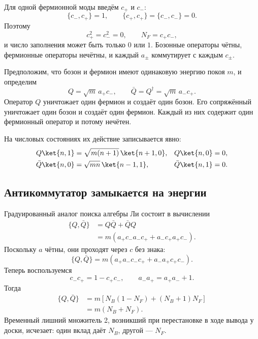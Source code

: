 Для одной фермионной моды введём \(c_+\) и \(c_-\):
\begin{equation}
\{c_-,c_+\}=1,
\qquad
\{c_+,c_+\}=\{c_-,c_-\}=0.
\end{equation}
Поэтому
\begin{equation}
c_+^2=c_-^2=0,
\qquad
N_F=c_+c_-,
\end{equation}
и число заполнения может быть только \(0\) или \(1\). Бозонные операторы чётны, фермионные операторы нечётны, и каждый \(a_\pm\) коммутирует с каждым \(c_\pm\).


Предположим, что бозон и фермион имеют одинаковую энергию покоя \(m\), и определим
\begin{equation}
Q=\sqrt m\,a_+c_-,
\qquad
\bar Q=Q^\dagger=\sqrt m\,a_-c_+.
\end{equation}
Оператор \(Q\) уничтожает один фермион и создаёт один бозон. Его сопряжённый уничтожает один бозон и создаёт один фермион. Каждый из них содержит один фермионный оператор и потому нечётен.

На числовых состояниях их действие записывается явно:
\begin{align}
Q\ket{n,1}
&=\sqrt{m(n+1)}\,\ket{n+1,0},
&
Q\ket{n,0}&=0,\\
\bar Q\ket{n,0}
&=\sqrt{mn}\,\ket{n-1,1},
&
\bar Q\ket{n,1}&=0.
\end{align}

\subsection{Антикоммутатор замыкается на энергии}

Градуированный аналог поиска алгебры Ли состоит в вычислении
\begin{align}
\{Q,\bar Q\}
&=Q\bar Q+\bar Q Q\\
&=m\left(a_+c_-a_-c_+
        +a_-c_+a_+c_-\right).
\end{align}
Поскольку \(a\) чётны, они проходят через \(c\) без знака:
\begin{equation}
\{Q,\bar Q\}
=m\left(a_+a_-c_-c_+
        +a_-a_+c_+c_-\right).
\end{equation}
Теперь воспользуемся
\begin{equation}
c_-c_+=1-c_+c_-,
\qquad
a_-a_+=a_+a_-+1.
\end{equation}
Тогда
\begin{align}
\{Q,\bar Q\}
&=m\left[
N_B(1-N_F)+(N_B+1)N_F
\right]\\
&=m(N_B+N_F).
\end{align}
Временный лишний множитель 2, возникший при перестановке в ходе вывода у доски, исчезает: один вклад даёт \(N_B\), другой — \(N_F\).

